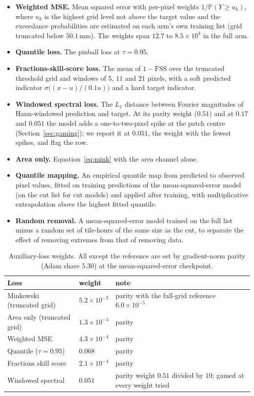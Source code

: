 \documentclass{article}
\begin{document}
\begin{itemize}
  \item \textbf{Weighted MSE.} Mean squared error with per-pixel weights $1/\mathbb{P}(Y \ge u_k)$, where $u_k$ is the
  highest grid level not above the target value and the exceedance probabilities are estimated on each arm's own
  training list (grid truncated below $50.1\,\mathrm{mm}$). The weights span $12.7$ to $8.5\times10^{4}$ in the full
  arm.
  \item \textbf{Quantile loss.} The pinball loss at $\tau = 0.95$.
  \item \textbf{Fractions-skill-score loss.} The mean of $1 - \mathrm{FSS}$ over the truncated threshold grid and
  windows of $5$, $11$ and $21$ pixels, with a soft predicted indicator $\sigma\big((x-u)/(0.1u)\big)$ and a hard
  target indicator.
  \item \textbf{Windowed spectral loss.} The $L_1$ distance between Fourier magnitudes of Hann-windowed prediction and
  target. At its parity weight ($0.51$) and at $0.17$ and $0.051$ the model adds a one-to-two-pixel spike at the patch
  centre (Section~\ref{sec:gaming}); we report it at $0.051$, the weight with the fewest spikes, and flag the row.
  \item \textbf{Area only.} Equation~\eqref{eq:mink} with the area channel alone.
  \item \textbf{Quantile mapping.} An empirical quantile map from predicted to observed pixel values, fitted on
  training predictions of the mean-squared-error model (on the cut list for cut models) and applied after training,
  with multiplicative extrapolation above the highest fitted quantile.
  \item \textbf{Random removal.} A mean-squared-error model trained on the full list minus a random set of tile-hours
  of the same size as the cut, to separate the effect of removing extremes from that of removing data.
\end{itemize}

\begin{table}[t]
  \centering
  \small
  \caption{Auxiliary-loss weights. All except the reference are set by gradient-norm parity (Adam share $5.30$) at the
  mean-squared-error checkpoint.}
  \label{tab:weights}
  \begin{tabular}{lll}
    \toprule
    Loss & weight & note \\
    \midrule
    Minkowski (truncated grid) & $5.2\times10^{-5}$ & parity with the full-grid reference $6.0\times10^{-5}$ \\
    Area only (truncated grid) & $1.3\times10^{-4}$ & parity \\
    Weighted MSE & $4.3\times10^{-4}$ & parity \\
    Quantile ($\tau=0.95$) & $0.068$ & parity \\
    Fractions skill score & $2.1\times10^{-4}$ & parity \\
    Windowed spectral & $0.051$ & parity weight $0.51$ divided by $10$; gamed at every weight tried \\
    \bottomrule
  \end{tabular}
\end{table}
\end{document}
